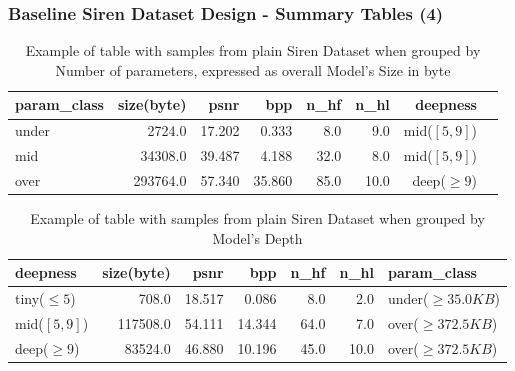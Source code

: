 \begin{frame}
\frametitle{Baseline Siren Dataset Design - Summary Tables (4)}

\begin{table}
\begin{tabular}{lrrrrrrl}
\hline
param\_class &  size(byte) &    psnr &   bpp &  n\_hf &  n\_hl &     deepness \\
\hline
\hline
under    &      2724.0 &  17.202 &   0.333 &    8.0 &   9.0 &   mid($[5,9]$) \\
mid &     34308.0 &  39.487 &   4.188 &  32.0 &   8.0 &   mid($[5,9]$) \\
over    &    293764.0 &  57.340 &  35.860 &  85.0 &  10.0 &  deep($\geq9$) \\
\hline
\end{tabular}
\caption{Example of table with samples from plain Siren Dataset when grouped by Number of parameters, expressed as overall Model's Size in byte}
\end{table}

\begin{table}
\begin{tabular}{lrrrrrl}
\hline
deepness &  size(byte) &    psnr &     bpp &  n\_hf &  n\_hl &   param\_class \\
\hline
\hline
tiny($ \leq 5$) &       708.0 &  18.517 &   0.086 &   8.0 &   2.0 &  under($ \geq 35.0KB$) \\
mid($[5,9]$)  &    117508.0 &  54.111 &  14.344 &  64.0 &   7.0 &  over($ \geq 372.5KB$) \\
deep($ \geq 9$) &     83524.0 &  46.880 &  10.196 &  45.0 &  10.0 &  over($ \geq 372.5KB$) \\
\hline
\end{tabular}
\caption{Example of table with samples from plain Siren Dataset when grouped by Model's Depth}
\end{table}



\end{frame}
